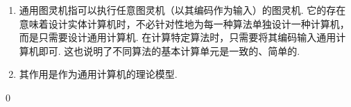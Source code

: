 \begin{pf} \rm \;
    \begin{enumerate}
        \item 通用图灵机指可以执行任意图灵机（以其编码作为输入）的图灵机. 它的存在意味着设计实体计算机时，不必针对性地为每一种算法单独设计一种计算机，而是只需要设计通用计算机. 在计算特定算法时，只需要将其编码输入通用计算机即可. 这也说明了不同算法的基本计算单元是一致的、简单的.
        \item 其作用是作为通用计算机的理论模型. 
    \end{enumerate}
    \qed
\end{pf}